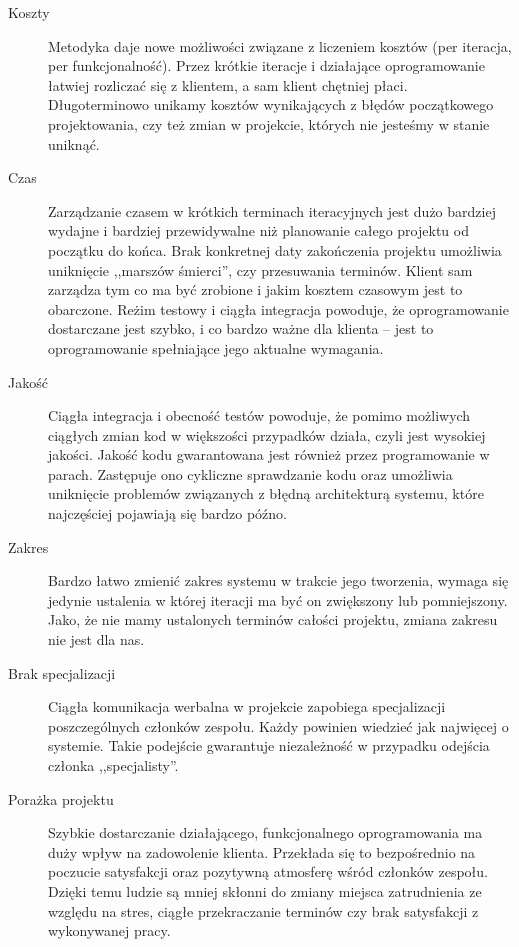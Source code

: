 \begin{description}
    \item[Koszty]{Metodyka daje nowe możliwości związane z liczeniem kosztów (per iteracja, per funkcjonalność). Przez krótkie iteracje i działające oprogramowanie łatwiej rozliczać się z klientem, a sam klient chętniej płaci. Długoterminowo unikamy kosztów wynikających z błędów początkowego projektowania, czy też zmian w projekcie, których nie jesteśmy w stanie uniknąć.}
    \item[Czas]{Zarządzanie czasem w krótkich terminach iteracyjnych jest dużo bardziej wydajne i bardziej przewidywalne niż planowanie całego projektu od początku do końca. Brak konkretnej daty zakończenia projektu umożliwia uniknięcie ,,marszów śmierci'', czy przesuwania terminów. Klient sam zarządza tym co ma być zrobione i jakim kosztem czasowym jest to obarczone. Reżim testowy i ciągła integracja powoduje, że oprogramowanie dostarczane jest szybko, i co bardzo ważne dla klienta -- jest to oprogramowanie spełniające jego aktualne wymagania.}
    \item[Jakość]{Ciągła integracja i obecność testów powoduje, że pomimo możliwych ciągłych zmian kod w większości przypadków działa, czyli jest wysokiej jakości. Jakość kodu gwarantowana jest również przez programowanie w parach. Zastępuje ono cykliczne sprawdzanie kodu oraz umożliwia uniknięcie problemów związanych z błędną architekturą systemu, które najczęściej pojawiają się bardzo późno.}
    \item[Zakres]{Bardzo łatwo zmienić zakres systemu w trakcie jego tworzenia, wymaga się jedynie ustalenia w której iteracji ma być on zwiększony lub pomniejszony. Jako, że nie mamy ustalonych terminów całości projektu, zmiana zakresu nie jest dla nas.}
    \item[Brak specjalizacji]{Ciągła komunikacja werbalna w projekcie zapobiega specjalizacji poszczególnych członków zespołu. Każdy powinien wiedzieć jak najwięcej o systemie. Takie podejście gwarantuje niezależność w przypadku odejścia członka ,,specjalisty''.}
    \item[Porażka projektu]{Szybkie dostarczanie działającego, funkcjonalnego oprogramowania ma duży wpływ na zadowolenie klienta. Przekłada się to bezpośrednio na poczucie satysfakcji oraz pozytywną atmosferę wśród członków zespołu. Dzięki temu ludzie są mniej skłonni do zmiany miejsca zatrudnienia ze względu na stres, ciągłe przekraczanie terminów czy brak satysfakcji z wykonywanej pracy.}
\end{description}

